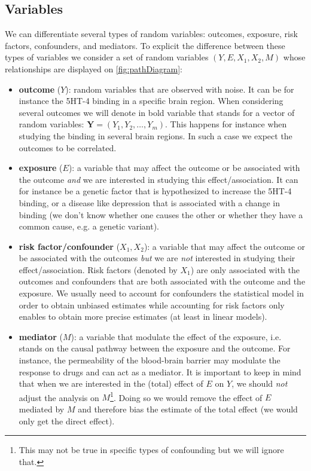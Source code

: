 \documentclass{article}
\begin{document}
\subsection{Variables}
\label{sec:orge3bd53a}

We can differentiate several types of random variables: outcomes,
exposure, risk factors, confounders, and mediators. To explicit the
difference between these types of variables we consider a set of
random variables \((Y,E,X_1,X_2,M)\) whose relationships are
displayed on \autoref{fig:pathDiagram}:
\begin{itemize}
\item \textbf{outcome} (\(Y\)): random variables that are observed with noise. It
can be for instance the 5HT-4 binding in a specific brain
region. When considering several outcomes we will denote in bold
variable that stands for a vector of random variables:
\(\mathbf{Y}=(Y_1,Y_2,\ldots,Y_m)\). This happens for instance when
studying the binding in several brain regions. In such a case we
expect the outcomes to be correlated.
\item \textbf{exposure} (\(E\)): a variable that may affect the outcome or be
associated with the outcome \emph{and} we are interested in studying this
effect/association. It can for instance be a genetic factor that is
hypothesized to increase the 5HT-4 binding, or a disease like
depression that is associated with a change in binding (we don't
know whether one causes the other or whether they have a common
cause, e.g. a genetic variant).
\item \textbf{risk factor/confounder} (\(X_1,X_2\)): a variable that
may affect the outcome or be associated with the outcomes \emph{but} we
are \emph{not} interested in studying their effect/association. Risk
factors (denoted by \(X_1\)) are only associated with the outcomes
and confounders that are both associated with the outcome and the
exposure. We usually need to account for confounders the statistical
model in order to obtain unbiased estimates while accounting for
risk factors only enables to obtain more precise estimates (at least
in linear models).
\item \textbf{mediator} (\(M\)): a variable that modulate the effect of the
exposure, i.e. stands on the causal pathway between the exposure and
the outcome. For instance, the permeability of the blood-brain
barrier may modulate the response to drugs and can act as a
mediator. It is important to keep in mind that when we are
interested in the (total) effect of \(E\) on \(Y\), we should \emph{not}
adjust the analysis on \(M\)\footnote{This may not be true in specific types of confounding but we
will ignore that.}. Doing so we would remove the effect of
\(E\) mediated by \(M\) and therefore bias the estimate of the total
effect (we would only get the direct effect).
\end{itemize}
\end{document}
